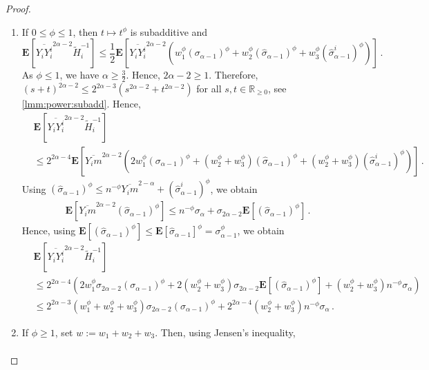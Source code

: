 \documentclass{article}
\newcommand{\R}{\mathbb{R}}
\newcommand{\Rp}{\R_{\geq0}}
\newcommand{\lab}{\left[} %
\newcommand{\rab}{\right]} %
\newcommand{\ab}[1]{\lab #1 \rab} %
\newcommand{\abOf}[1]{\!\ab{#1}} %
\newcommand{\lb}{\left(} %
\newcommand{\rb}{\right)} %
\newcommand{\br}[1]{\lb #1 \rb} %
\newcommand{\E}{\mathbf{E}} %
\newcommand{\EOf}[1]{\E\abOf{#1}}
\newcommand{\eqfs}{\,.}
\newcommand{\ol}[2]{\overline{#1#2}}
\begin{document}
\begin{proof}
\begin{enumerate}[label=(\roman*)]
		\item
	If $0 \leq \phi \leq 1$, then $t\mapsto t^\phi$ is subadditive and
	\begin{equation}
		\EOf{\ol {Y_i}{Y_i^i}^{2\alpha-2} \tilde H_i^{-1}}
		\leq
		\frac12\EOf{
			\ol {Y_i}{Y_i^i}^{2\alpha-2}
			\br{
				w_1^{\phi} (\sigma_{\alpha-1})^{\phi}
				+
				w_2^{\phi} (\hat\sigma_{\alpha-1})^{\phi}
				+
				w_3^{\phi} (\hat\sigma^i_{\alpha-1})^{\phi}
			}
		}
		\eqfs
	\end{equation}
	As $\phi\leq 1$, we have $\alpha \geq \frac32$. Hence, $2\alpha-2\geq 1$. Therefore, $(s+t)^{2\alpha-2} \leq 2^{2\alpha-3} (s^{2\alpha-2} + t^{2\alpha-2})$ for all $s,t\in\Rp$, see \cref{lmm:power:subadd}. Hence,
	\begin{align}
		&\EOf{\ol {Y_i}{Y_i^i}^{2\alpha-2} \tilde H_i^{-1}}
		\\&\leq
		2^{2\alpha-4} \EOf{
				\ol {Y_i}{m}^{2\alpha-2}
				\br{
					2 w_1^{\phi} (\sigma_{\alpha-1})^{\phi}
					+
					\br{w_2^{\phi}+w_3^{\phi}} (\hat\sigma_{\alpha-1})^{\phi}
					+
					\br{w_2^{\phi}+w_3^{\phi}} (\hat\sigma^i_{\alpha-1})^{\phi}
				}
			}
		\eqfs
	\end{align}
	Using $(\hat\sigma_{\alpha-1})^{\phi} \leq n^{-\phi} \ol{Y_i}m^{2-\alpha} + (\hat\sigma^i_{\alpha-1})^{\phi}$, we obtain
	\begin{align}
		\EOf{
			\ol {Y_i}{m}^{2\alpha-2}
			(\hat\sigma_{\alpha-1})^{\phi}
		}
		\leq
		n^{-\phi} \sigma_\alpha 
		+
		\sigma_{2\alpha-2}\EOf{(\hat\sigma_{\alpha-1})^{\phi}}
        \eqfs
	\end{align}
	Hence, using $\EOf{\br{\hat\sigma_{\alpha-1}}^{\phi}} \leq \EOf{\hat\sigma_{\alpha-1}}^{\phi} =  \sigma_{\alpha-1}^{\phi}$, we obtain
	\begin{align}
		&\EOf{\ol {Y_i}{Y_i^i}^{2\alpha-2} \tilde H_i^{-1}}
		\\&\leq
		2^{2\alpha-4} 
		\br{
			2 w_1^{\phi} \sigma_{2\alpha-2} (\sigma_{\alpha-1})^{\phi}
			+
			2 \br{w_2^{\phi}+w_3^{\phi}} \sigma_{2\alpha-2}\EOf{(\hat\sigma_{\alpha-1})^{\phi}}
			+
			\br{w_2^{\phi}+w_3^{\phi}} n^{-\phi} \sigma_\alpha 
		}
		\\&\leq
		2^{2\alpha-3} \br{w_1^{\phi}+w_2^{\phi}+w_3^{\phi}} \sigma_{2\alpha-2} (\sigma_{\alpha-1})^{\phi}
		+
		2^{2\alpha-4}  \br{w_2^{\phi}+w_3^{\phi}} n^{-\phi} \sigma_\alpha 
		\eqfs
	\end{align}
	\item 
	If $\phi\geq1$, set $w := w_1+w_2+w_3$. Then, using Jensen's inequality,
	\begin{align}

\end{align}
\end{enumerate}
\end{proof}
\end{document}
